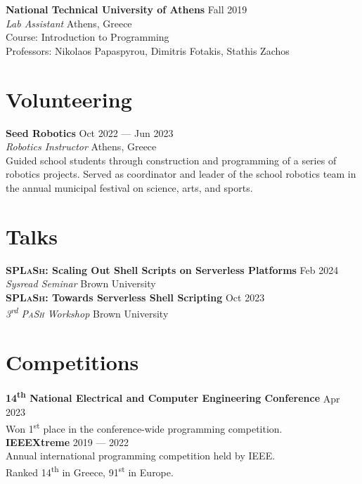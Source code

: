 \documentclass[margin, 12pt]{resume}
\newcommand{\splash}{\textsc{SPLaSh}\xspace}
\newcommand{\sectionVSpace}{\vspace{-3.5ex}} %
\newcommand{\competition}[1]{\textbf{#1}\xspace}
\newcommand{\event}[1]{\textit{#1}\xspace}
\newcommand{\institution}[1]{\textbf{#1}\xspace}
\newcommand{\ordinal}[1]{\textsuperscript{#1}\xspace}
\newcommand{\rSection}[1]{\sectionVSpace\section{#1}\xspace}
\newcommand{\role}[1]{\textit{#1}\xspace}
\newcommand{\stitle}[1]{#1:\xspace}
\newcommand{\talk}[1]{\textbf{#1}\xspace}
\begin{document}
\begin{resume}
    \institution{National Technical University of Athens} \hfill Fall 2019 \\
    \role{Lab Assistant} \hfill Athens, Greece \\
    \stitle{Course} Introduction to Programming \\
    \stitle{Professors} Nikolaos Papaspyrou, Dimitris Fotakis, Stathis Zachos \\

    \rSection{Volunteering}

    \institution{Seed Robotics} \hfill Oct 2022 --- Jun 2023 \\
    \role{Robotics Instructor} \hfill Athens, Greece \\
    Guided school students through construction and programming of a series of robotics projects. Served as coordinator and leader of the school robotics team in the annual municipal festival on science, arts, and sports. \\

    \rSection{Talks}


    \talk{\splash: Scaling Out Shell Scripts on Serverless Platforms} \hfill Feb 2024 \\
    \event{Sysread Seminar} \hfill Brown University \\


    \talk{\splash: Towards Serverless Shell Scripting} \hfill Oct 2023 \\
    \event{3\ordinal{rd} \textsc{PaSh} Workshop} \hfill Brown University \\

    \rSection{Competitions}

    \competition{14\ordinal{th} National Electrical and Computer Engineering Conference} \hfill Apr 2023 \\
    Won 1\ordinal{st} place in the conference-wide programming competition. \\

    \competition{IEEEXtreme} \hfill 2019 --- 2022 \\
    Annual international programming competition held by IEEE. \\
    Ranked 14\ordinal{th} in Greece, 91\ordinal{st} in Europe. \\


\end{resume}
\end{document}

